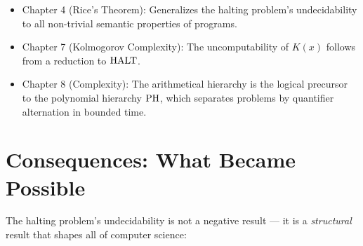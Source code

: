 \begin{itemize}
\item Chapter 4 (Rice's Theorem): Generalizes the halting problem's undecidability to all non-trivial semantic properties of programs.
\item Chapter 7 (Kolmogorov Complexity): The uncomputability of $K(x)$ follows from a reduction to $\text{HALT}$.
\item Chapter 8 (Complexity): The arithmetical hierarchy is the logical precursor to the polynomial hierarchy $\text{PH}$, which separates problems by quantifier alternation in bounded time.
\end{itemize}

\section{Consequences: What Became Possible}
\label{sec:halting:consequences}

The halting problem's undecidability is not a negative result — it is a \emph{structural} result that shapes all of computer science:


